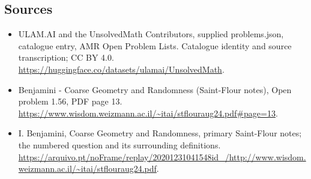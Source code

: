 \documentclass[11pt,a4paper]{article}
\begin{document}
\subsection{Sources}
\begin{itemize}
\item[S1] ULAM.AI and the UnsolvedMath Contributors, supplied problems.json, catalogue entry, AMR Open Problem Lists. Catalogue identity and source transcription; CC BY 4.0.
\url{https://huggingface.co/datasets/ulamai/UnsolvedMath}.
\item[S2] Benjamini - Coarse Geometry and Randomness (Saint-Flour notes), Open problem 1.56, PDF page 13. 
\url{https://www.wisdom.weizmann.ac.il/~itai/stflouraug24.pdf#page=13}.
\item[S3] I. Benjamini, Coarse Geometry and Randomness, primary Saint-Flour notes; the numbered question and its surrounding definitions.
\url{https://arquivo.pt/noFrame/replay/20201231041548id_/http://www.wisdom.weizmann.ac.il/~itai/stflouraug24.pdf}.
\end{itemize}
\end{document}
